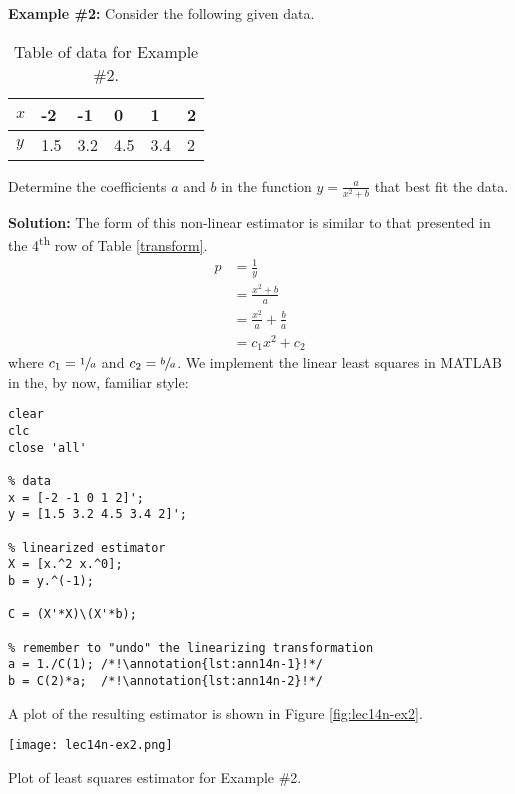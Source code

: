 \vspace{0.5cm}

\noindent \textbf{Example \#2:} Consider the following given data.

\begin{table}
\begin{tabular}{|l|l|l|l|l|l|}
\hline
$x$ & -2 & -1 & 0 & 1 & 2 \\ \hline
$y$ & 1.5 & 3.2 & 4.5 & 3.4 & 2 \\ \hline 
\end{tabular}
\caption{Table of data for Example \#2.}
\label{tab:lec14n-ex2}
\end{table}

\vspace{0.2cm}

\noindent Determine the coefficients $a$ and $b$ in the function $y=\frac{a}{x^2 + b}$ that best fit the data.

\vspace{0.2cm}


\noindent \textbf{Solution: } The form of this non-linear estimator is similar to that presented in the 4\textsuperscript{th} row of Table \ref{transform}.  
\begin{align*}
p &= \frac{1}{y} \\
&= \frac{x^2 + b}{a} \\
&= \frac{x^2}{a} + \frac{b}{a} \\
&= c_1 x^2 + c_2
\end{align*}
where $c_1 = \sfrac{1}{a}$ and $c_2 = \sfrac{b}{a}$.  We implement the linear least squares in MATLAB in the, by now, familiar style: 
\begin{lstlisting}[style=myMatlab]
clear
clc
close 'all'

% data
x = [-2 -1 0 1 2]';
y = [1.5 3.2 4.5 3.4 2]';

% linearized estimator
X = [x.^2 x.^0];
b = y.^(-1);

C = (X'*X)\(X'*b);

% remember to "undo" the linearizing transformation
a = 1./C(1); /*!\annotation{lst:ann14n-1}!*/
b = C(2)*a;  /*!\annotation{lst:ann14n-2}!*/
\end{lstlisting}
A plot of the resulting estimator is shown in Figure \ref{fig:lec14n-ex2}.
\begin{marginfigure}[-0.25cm]
\texttt{[image: lec14n-ex2.png]}
\caption{Plot of least squares estimator for Example \#2.}
\label{fig:lec14n-ex2}
\end{marginfigure}

